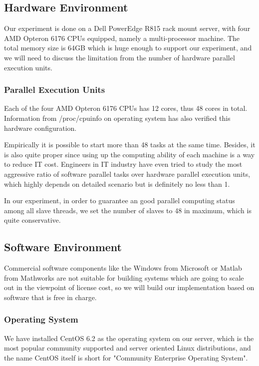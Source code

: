 \subsection{Hardware Environment}

Our experiment is done on a Dell PowerEdge R815 rack mount server, with four AMD Opteron 6176 CPUs equipped, namely a multi-processor machine. The total memory size is 64GB which is huge enough to support our experiment, and we will need to discuss the limitation from the number of hardware parallel execution units.

\subsubsection{Parallel Execution Units}

Each of the four AMD Opteron 6176 CPUs has 12 cores, thus 48 cores in total. Information from /proc/cpuinfo on operating system has also verified this hardware configuration.

Empirically it is possible to start more than 48 tasks at the same time. Besides, it is also quite proper since using up the computing ability of each machine is a way to reduce IT cost. Engineers in IT industry have even tried to study the most aggressive ratio of software parallel tasks over hardware parallel execution units, which highly depends on detailed scenario but is definitely no less than 1.

In our experiment, in order to guarantee an good parallel computing status among all slave threads, we set the number of slaves to 48 in maximum, which is quite conservative.

\subsection{Software Environment}

Commercial software components like the Windows from Microsoft or Matlab from Mathworks are not suitable for building systems which are going to scale out in the viewpoint of license cost, so we will build our implementation based on software that is free in charge.

\subsubsection{Operating System}

We have installed CentOS 6.2 as the operating system on our server, which is the most popular community supported and server oriented Linux distributions, and the name CentOS itself is short for "Community Enterprise Operating System".

